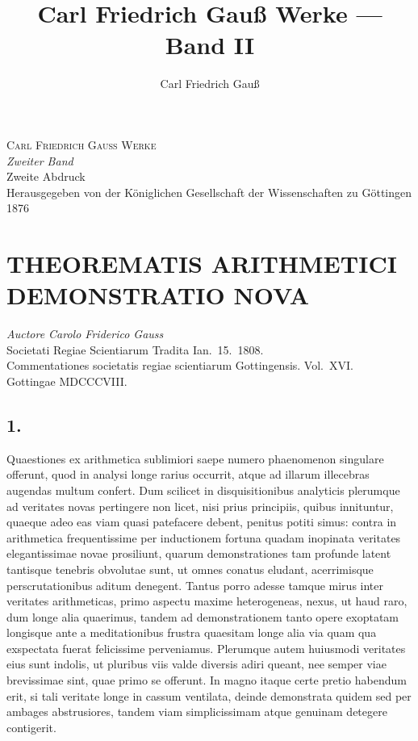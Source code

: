 \documentclass[12pt,a4paper]{article}
\title{Carl Friedrich Gauß Werke --- Band II}
\author{Carl Friedrich Gauß}
\date{}
\theoremstyle{plain}
\begin{document}
\maketitle

\thispagestyle{empty}

\begin{center}
\Large\textsc{Carl Friedrich Gauß Werke}\\[0.5em]
\large\textit{Zweiter Band}\\[1em]
\normalsize Zweite Abdruck\\
Herausgegeben von der Königlichen Gesellschaft der Wissenschaften zu Göttingen\\
1876
\end{center}

\newpage
\setcounter{page}{1}

\section*{THEOREMATIS ARITHMETICI DEMONSTRATIO NOVA}

\begin{center}
\textit{Auctore Carolo Friderico Gauss}\\
Societati Regiae Scientiarum Tradita Ian.\ 15.\ 1808.\\[0.5em]
\small Commentationes societatis regiae scientiarum Gottingensis. Vol.\ XVI.\\
Gottingae MDCCCVIII.
\end{center}

\subsection*{1.}

Quaestiones ex arithmetica sublimiori saepe numero phaenomenon singulare offerunt, quod in analysi longe rarius occurrit, atque ad illarum illecebras augendas multum confert. Dum scilicet in disquisitionibus analyticis plerumque ad veritates novas pertingere non licet, nisi prius principiis, quibus innituntur, quaeque adeo eas viam quasi patefacere debent, penitus potiti simus: contra in arithmetica frequentissime per inductionem fortuna quadam inopinata veritates elegantissimae novae prosiliunt, quarum demonstrationes tam profunde latent tantisque tenebris obvolutae sunt, ut omnes conatus eludant, acerrimisque perscrutationibus aditum denegent. Tantus porro adesse tamque mirus inter veritates arithmeticas, primo aspectu maxime heterogeneas, nexus, ut haud raro, dum longe alia quaerimus, tandem ad demonstrationem tanto opere exoptatam longisque ante a meditationibus frustra quaesitam longe alia via quam qua exspectata fuerat felicissime perveniamus. Plerumque autem huiusmodi veritates eius sunt indolis, ut pluribus viis valde diversis adiri queant, nee semper viae brevissimae sint, quae primo se offerunt. In magno itaque certe pretio habendum erit, si tali veritate longe in cassum ventilata, deinde demonstrata quidem sed per ambages abstrusiores, tandem viam simplicissimam atque genuinam detegere contigerit.
\end{document}
